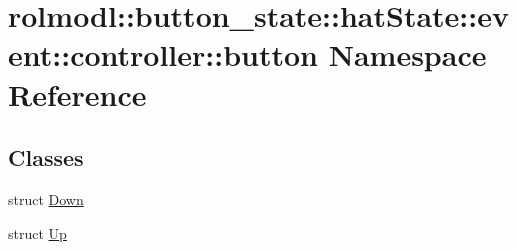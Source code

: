 \hypertarget{namespacerolmodl_1_1button__state_1_1hat_state_1_1event_1_1controller_1_1button}{}\section{rolmodl\+::button\+\_\+state\+::hat\+State\+::event\+::controller\+::button Namespace Reference}
\label{namespacerolmodl_1_1button__state_1_1hat_state_1_1event_1_1controller_1_1button}
\subsection*{Classes}
\begin{DoxyCompactItemize}
\item 
struct \mbox{\hyperlink{structrolmodl_1_1button__state_1_1hat_state_1_1event_1_1controller_1_1button_1_1_down}{Down}}
\item 
struct \mbox{\hyperlink{structrolmodl_1_1button__state_1_1hat_state_1_1event_1_1controller_1_1button_1_1_up}{Up}}
\end{DoxyCompactItemize}
